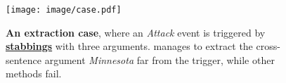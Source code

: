 \begin{figure}[htbp]
    \centering
    \texttt{[image: image/case.pdf]}
    \caption{
    \textbf{An extraction case}, where an \emph{Attack} event is triggered by \underline{\textbf{stabbings}} with three arguments. 
    \modelname manages to extract the cross-sentence argument \emph{Minnesota} far from the trigger, while other methods fail.
    }
\label{fig:case-study}
\end{figure}